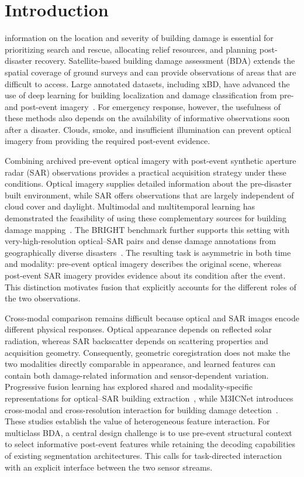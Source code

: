 \documentclass[journal]{IEEEtran}
\begin{document}
    
    \section{Introduction}
    \label{sec:introduction}
     information on the location and severity of building damage is essential for prioritizing search and rescue, allocating relief resources, and planning post-disaster recovery. Satellite-based building damage assessment (BDA) extends the spatial coverage of ground surveys and can provide observations of areas that are difficult to access. Large annotated datasets, including xBD, have advanced the use of deep learning for building localization and damage classification from pre- and post-event imagery~\cite{gupta2019xbd}. For emergency response, however, the usefulness of these methods also depends on the availability of informative observations soon after a disaster. Clouds, smoke, and insufficient illumination can prevent optical imagery from providing the required post-event evidence.
    
    Combining archived pre-event optical imagery with post-event synthetic aperture radar (SAR) observations provides a practical acquisition strategy under these conditions. Optical imagery supplies detailed information about the pre-disaster built environment, while SAR offers observations that are largely independent of cloud cover and daylight. Multimodal and multitemporal learning has demonstrated the feasibility of using these complementary sources for building damage mapping~\cite{adriano2021multimodal}. The BRIGHT benchmark further supports this setting with very-high-resolution optical--SAR pairs and dense damage annotations from geographically diverse disasters~\cite{chen2025bright}. The resulting task is asymmetric in both time and modality: pre-event optical imagery describes the original scene, whereas post-event SAR imagery provides evidence about its condition after the event. This distinction motivates fusion that explicitly accounts for the different roles of the two observations.
    
    Cross-modal comparison remains difficult because optical and SAR images encode different physical responses. Optical appearance depends on reflected solar radiation, whereas SAR backscatter depends on scattering properties and acquisition geometry. Consequently, geometric coregistration does not make the two modalities directly comparable in appearance, and learned features can contain both damage-related information and sensor-dependent variation. Progressive fusion learning has explored shared and modality-specific representations for optical--SAR building extraction~\cite{li2023progressive}, while M3ICNet introduces cross-modal and cross-resolution interaction for building damage detection~\cite{zhang2025m3icnet}. These studies establish the value of heterogeneous feature interaction. For multiclass BDA, a central design challenge is to use pre-event structural context to select informative post-event features while retaining the decoding capabilities of existing segmentation architectures. This calls for task-directed interaction with an explicit interface between the two sensor streams.
    
\end{document}
